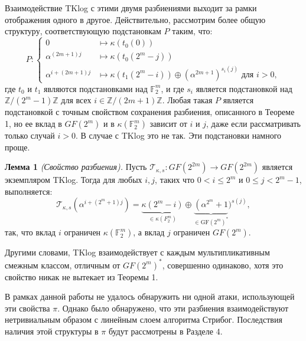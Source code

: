 Взаимодействие TKlog с этими двумя разбиениями выходит за рамки отображения одного в другое. Действительно, рассмотрим более общую структуру, соответствующую подстановкам \( P \) таким, что:
\begin{equation}
  P :
  \begin{cases}
    0 & \mapsto \kappa (t_0(0)) \\
    \alpha^{(2m+1)j} & \mapsto \kappa (t_0(2^m - j)) \\
    \alpha^{i+(2m+1)j} & \mapsto \kappa (t_1(2^m - i)) \oplus (\alpha^{2m+1})^{s_i(j)} \text{ для } i > 0,
  \end{cases}
  \label{eq:02}
\end{equation}
где \( t_0 \) и \( t_1 \) являются подстановками над \( \mathbb{F}_{2}^{m} \), и где \( s_i \) является подстановкой над \( \mathbb{Z}/(2^m - 1)\mathbb{Z} \) для всех \( i \in \mathbb{Z}/(2m + 1)\mathbb{Z} \). Любая такая \( P \) является подстановкой с точным свойством сохранения разбиения, описанного в Теореме 1, но ее вклад в \( GF (2^m) \) и в \( \kappa(\mathbb{F}_{2}^{m}) \) зависит от \( i \) и \( j \), даже если рассматривать только случай \( i > 0 \). В случае с TKlog это не так. Эти подстановки намного проще.

\textbf{Лемма 1} \textit{(Свойство разбиения).} Пусть \( \mathscr{T}_{\kappa,s} : GF(2^{2m}) \to GF(2^{2m}) \) является экземпляром TKlog. Тогда для любых \( i, j \), таких что \( 0 < i \leq 2^m \) и \( 0 \leq j < 2^m - 1 \), выполняется:
\[
  \mathscr{T}_{\kappa, s}\left(\alpha^{i+\left(2^m+1\right) j}\right)=\underbrace{\kappa\left(2^m-i\right)}_{\in \kappa\left(F_2^m\right)} \oplus \underbrace{\left(\alpha^{2^m}+1\right.}_{\in \mathrm{GF}\left(2^m\right)^*})^{s(j)},
\]
так, что вклад \( i \) ограничен \( \kappa(\mathbb{F}_{2}^{m}) \), а вклад \( j \) ограничен \( GF(2^m) \).

Другими словами, TKlog взаимодействует с каждым мультипликативным смежным классом, отличным от \( GF(2^m)^{\ast} \), совершенно одинаково, хотя это свойство никак не вытекает из Теоремы 1.

В рамках данной работы не удалось обнаружить ни одной атаки, использующей эти свойства \( \pi \). Однако было обнаружено, что эти разбиения взаимодействуют нетривиальным образом с линейным слоем алгоритма Стрибог. Последствия наличия этой структуры в \( \pi \) будут рассмотрены в Разделе 4.